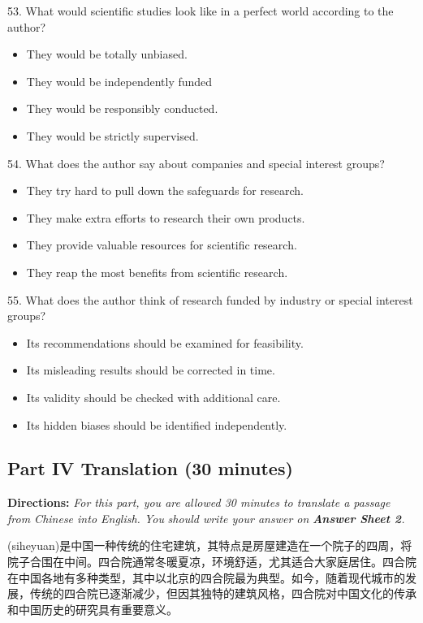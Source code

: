 \documentclass[UTF8,11pt]{ctexart}
\begin{document}
53. What would scientific studies look like in a perfect world according to the author?


\begin{itemize}[leftmargin=2em,itemsep=.2em,topsep=.4em]\item[A.] They would be totally unbiased.
\item[B.] They would be independently funded
\item[C.] They would be responsibly conducted.
\item[D.] They would be strictly supervised.
\end{itemize}

54. What does the author say about companies and special interest groups?


\begin{itemize}[leftmargin=2em,itemsep=.2em,topsep=.4em]\item[A.] They try hard to pull down the safeguards for research.
\item[B.] They make extra efforts to research their own products.
\item[C.] They provide valuable resources for scientific research.
\item[D.] They reap the most benefits from scientific research.
\end{itemize}

55. What does the author think of research funded by industry or special interest groups?


\begin{itemize}[leftmargin=2em,itemsep=.2em,topsep=.4em]\item[A.] Its recommendations should be examined for feasibility.
\item[B.] Its misleading results should be corrected in time.
\item[C.] Its validity should be checked with additional care.
\item[D.] Its hidden biases should be identified independently.
\end{itemize}

\subsection*{\textbf{Part IV Translation (30 minutes)}}


\textbf{Directions: }\textit{For this part, you are allowed 30 minutes to translate a passage from Chinese into English. You} \textit{should write your answer on }\textbf{\textit{Answer Sheet 2}}\textit{.}


(siheyuan)是中国一种传统的住宅建筑，其特点是房屋建造在一个院子的四周，将院子合围在中间。四合院通常冬暖夏凉，环境舒适，尤其适合大家庭居住。四合院在中国各地有多种类型，其中以北京的四合院最为典型。如今，随着现代城市的发展，传统的四合院已逐渐减少，但因其独特的建筑风格，四合院对中国文化的传承和中国历史的研究具有重要意义。
\end{document}
